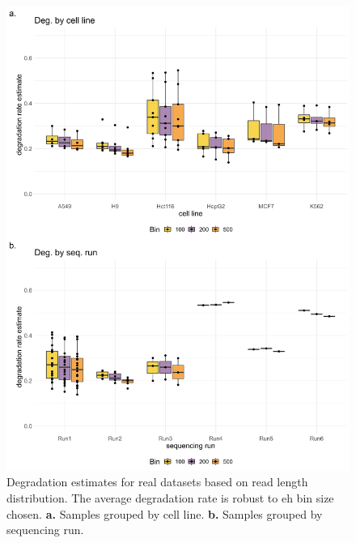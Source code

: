 \begin{figure}[p]
    \centering
    \includegraphics[width=\textwidth]{figures/sec-2-length-sgnex.png}
    \caption[Degradation estimates for real datasets based on read length distribution]{Degradation estimates for real datasets based on read length distribution. The average degradation rate is robust to eh bin size chosen. \textbf{a.} Samples grouped by cell line. \textbf{b.} Samples grouped by sequencing run.}
    \label{fig:length-sgnex}
\end{figure}

